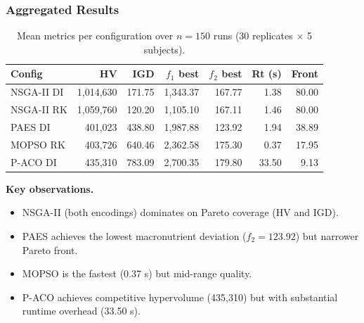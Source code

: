 \documentclass[aspectratio=169,10pt]{beamer}
\begin{document}
\begin{frame}
\frametitle{Aggregated Results}

\begin{table}
\centering\small
\begin{tabular}{lrrrrrr}
\toprule
\textbf{Config} & \textbf{HV} & \textbf{IGD} & \textbf{$f_1$ best} & \textbf{$f_2$ best} & \textbf{Rt (s)} & \textbf{Front} \\
\midrule
NSGA-II DI & 1,014,630 & 171.75 & 1,343.37 & 167.77 & 1.38 & 80.00 \\
NSGA-II RK & 1,059,760 & 120.20 & 1,105.10 & 167.11 & 1.46 & 80.00 \\
PAES DI & 401,023 & 438.80 & 1,987.88 & 123.92 & 1.94 & 38.89 \\
MOPSO RK & 403,726 & 640.46 & 2,362.58 & 175.30 & 0.37 & 17.95 \\
P-ACO DI & 435,310 & 783.09 & 2,700.35 & 179.80 & 33.50 & 9.13 \\
\bottomrule
\end{tabular}
\caption{Mean metrics per configuration over $n=150$ runs (30 replicates $\times$ 5 subjects).}
\end{table}

\vspace{0.3cm}

\textbf{Key observations.}
\begin{itemize}
  \item NSGA-II (both encodings) dominates on Pareto coverage (HV and IGD).
  \item PAES achieves the lowest macronutrient deviation ($f_2 = 123.92$) but narrower Pareto front.
  \item MOPSO is the fastest (0.37 s) but mid-range quality.
  \item P-ACO achieves competitive hypervolume (435,310) but with substantial runtime overhead (33.50 s).
\end{itemize}

\end{frame}
\end{document}
